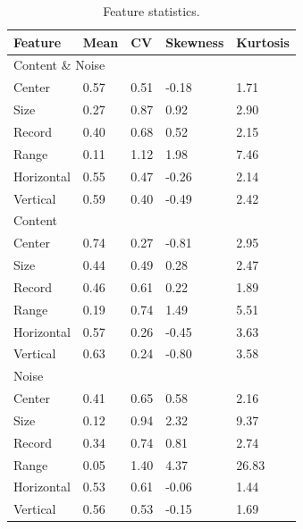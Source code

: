 \begin{table}[h]
\centering
\caption{Feature statistics.}
\label{tab:stat}
\begin{tabular}{ | l | l | l | l | l |}
\hline
Feature & Mean & CV & Skewness & Kurtosis \\
\hline
\multicolumn{5}{|l|}{Content \& Noise} \\
\hline
Center & 0.57 & 0.51 & -0.18 & 1.71 \\
Size & 0.27 & 0.87 & 0.92 & 2.90 \\
Record & 0.40 & 0.68 & 0.52 & 2.15 \\
Range & 0.11 & 1.12 & 1.98 & 7.46 \\
Horizontal & 0.55 & 0.47 & -0.26 & 2.14 \\
Vertical & 0.59 & 0.40 & -0.49 & 2.42 \\
\hline
\multicolumn{5}{|l|}{Content} \\
\hline
Center & 0.74 & 0.27 & -0.81 & 2.95 \\
Size & 0.44 & 0.49 & 0.28 & 2.47 \\
Record & 0.46 & 0.61 & 0.22 & 1.89 \\
Range & 0.19 & 0.74 & 1.49 & 5.51 \\
Horizontal & 0.57 & 0.26 & -0.45 & 3.63 \\
Vertical & 0.63 & 0.24 & -0.80 & 3.58 \\
\hline
\multicolumn{5}{|l|}{Noise} \\
\hline
Center & 0.41 & 0.65 & 0.58 & 2.16 \\
Size & 0.12 & 0.94 & 2.32 & 9.37 \\
Record & 0.34 & 0.74 & 0.81 & 2.74 \\
Range & 0.05 & 1.40 & 4.37 & 26.83 \\
Horizontal & 0.53 & 0.61 & -0.06 & 1.44 \\
Vertical & 0.56 & 0.53 & -0.15 & 1.69 \\
\hline
\end{tabular}
\end{table}

